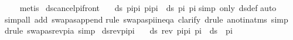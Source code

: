 \begin{isabellebody}
\ \ \isamarkupfalse%
\ metis%
\endisatagproof
{\isafoldproof}%
%
\isadelimproof
\isanewline
%
\endisadelimproof
\isanewline
\isanewline
\isanewline
{}\isamarkupfalse%
\ ds{\isacharunderscore}{\kern0pt}cancel{\isacharunderscore}{\kern0pt}pi{\isacharunderscore}{\kern0pt}front{\isacharcolon}{\kern0pt}\ \isanewline
\ \ {\isachardoublequoteopen}ds\ {\isacharparenleft}{\kern0pt}pi{\isacharat}{\kern0pt}pi{}{\isacharparenright}{\kern0pt}\ {\isacharparenleft}{\kern0pt}pi{\isacharat}{\kern0pt}pi{}{\isacharparenright}{\kern0pt}\ {\isacharequal}{\kern0pt}\ ds\ pi{}\ pi{}{\isachardoublequoteclose}\isanewline
%
\isadelimproof
%
\endisadelimproof
%
\isatagproof
{}\isamarkupfalse%
{\isacharparenleft}{\kern0pt}simp\ only{\isacharcolon}{\kern0pt}\ ds{\isacharunderscore}{\kern0pt}def{\isacharparenright}{\kern0pt}\isanewline
{}\isamarkupfalse%
{\isacharparenleft}{\kern0pt}auto{\isacharparenright}{\kern0pt}\isanewline
{}\isamarkupfalse%
{\isacharparenleft}{\kern0pt}simp{\isacharunderscore}{\kern0pt}all\ add{\isacharcolon}{\kern0pt}\ swapas{\isacharunderscore}{\kern0pt}append{\isacharparenright}{\kern0pt}\isanewline
{}\isamarkupfalse%
{\isacharparenleft}{\kern0pt}rule\ swapas{\isacharunderscore}{\kern0pt}pi{\isacharunderscore}{\kern0pt}ineq{\isacharunderscore}{\kern0pt}a{\isacharcomma}{\kern0pt}\ clarify{\isacharcomma}{\kern0pt}\ drule\ a{\isacharunderscore}{\kern0pt}not{\isacharunderscore}{\kern0pt}in{\isacharunderscore}{\kern0pt}atms{\isacharcomma}{\kern0pt}\ simp{\isacharparenright}{\kern0pt}{\isacharplus}{\kern0pt}\isanewline
{}\isamarkupfalse%
{\isacharparenleft}{\kern0pt}drule\ swapas{\isacharunderscore}{\kern0pt}rev{\isacharunderscore}{\kern0pt}pi{\isacharunderscore}{\kern0pt}a{\isacharcomma}{\kern0pt}\ simp{\isacharparenright}{\kern0pt}{\isacharplus}{\kern0pt}\isanewline
{}\isamarkupfalse%
%
\endisatagproof
{\isafoldproof}%
%
\isadelimproof
\isanewline
%
\endisadelimproof
\isanewline
{}\isamarkupfalse%
\ ds{\isacharunderscore}{\kern0pt}rev{\isacharunderscore}{\kern0pt}pi{\isacharunderscore}{\kern0pt}pi{\isacharcolon}{\kern0pt}\ \isanewline
\ \ {\isachardoublequoteopen}ds\ {\isacharparenleft}{\kern0pt}{\isacharparenleft}{\kern0pt}rev\ pi{}{\isacharparenright}{\kern0pt}{\isacharat}{\kern0pt}pi{}{\isacharparenright}{\kern0pt}\ pi{}\ {\isacharequal}{\kern0pt}\ ds\ {\isacharbrackleft}{\kern0pt}{\isacharbrackright}{\kern0pt}\ pi{}{\isachardoublequoteclose}\isanewline

\end{isabellebody}
